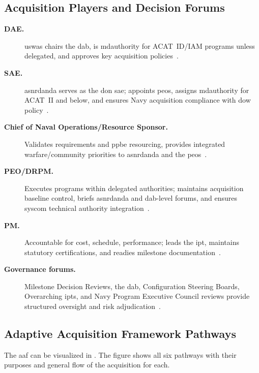 \documentclass[../main.tex]{subfiles}
\begin{document}
\subsection{Acquisition Players and Decision Forums}
\begin{description}
	\item[\textbf{DAE.}] \ac{uswas} chairs the \ac{dab}, is \ac{mdauthority} for ACAT~ID/IAM programs unless delegated, and approves key acquisition policies~\autocite{DoDD5000-01,edo-3-3-1-acq-policy-players-2025}.
	\item[\textbf{SAE.}] \ac{asnrdanda} serves as the \ac{don} \ac{sae}; appoints \acp{peo}, assigns \ac{mdauthority} for ACAT~II and below, and ensures Navy acquisition compliance with \ac{dow} policy~\autocite{SECNAV5000-2G,SECNAV5400-15D}.
	\item[\textbf{Chief of Naval Operations/Resource Sponsor.}] Validates requirements and \ac{ppbe} resourcing, provides integrated warfare/community priorities to \ac{asnrdanda} and the \acp{peo}~\autocite{edo-3-3-1-acq-policy-players-2025}.
	\item[\textbf{PEO/DRPM.}] Executes programs within delegated authorities; maintains acquisition baseline control, briefs \ac{asnrdanda} and \ac{dab}-level forums, and ensures \ac{syscom} technical authority integration~\autocite{SECNAV5400-15D,DoDI5000-85}.
	\item[\textbf{PM.}] Accountable for cost, schedule, performance; leads the \ac{ipt}, maintains statutory certifications, and readies milestone documentation~\autocite{DoDI5000-85,edo-3-3-1-acq-policy-players-2025}.
	\item[\textbf{Governance forums.}] Milestone Decision Reviews, the \ac{dab}, Configuration Steering Boards, Overarching \acp{ipt}, and Navy Program Executive Council reviews provide structured oversight and risk adjudication~\autocite{DoDD5000-01,DoDI5000-85,edo-3-3-1-acq-policy-players-2025}.
\end{description}

\subsection{Adaptive Acquisition Framework Pathways}
The \ac{aaf} can be visualized in \Fig{\ref{fig:aaf}}. The figure shows all six pathways with their purposes and general flow of the acquisition for each.
\end{document}
